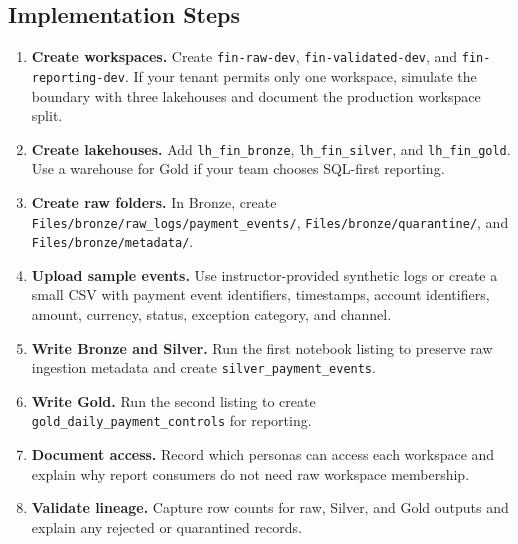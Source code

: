 \subsection*{Implementation Steps}
\begin{enumerate}
    \item \textbf{Create workspaces.} Create \texttt{fin-raw-dev}, \texttt{fin-validated-dev}, and \texttt{fin-reporting-dev}. If your tenant permits only one workspace, simulate the boundary with three lakehouses and document the production workspace split.
    \item \textbf{Create lakehouses.} Add \texttt{lh\_fin\_bronze}, \texttt{lh\_fin\_silver}, and \texttt{lh\_fin\_gold}. Use a warehouse for Gold if your team chooses SQL-first reporting.
    \item \textbf{Create raw folders.} In Bronze, create \texttt{Files/bronze/raw\_logs/payment\_events/}, \texttt{Files/bronze/quarantine/}, and \texttt{Files/bronze/metadata/}.
    \item \textbf{Upload sample events.} Use instructor-provided synthetic logs or create a small CSV with payment event identifiers, timestamps, account identifiers, amount, currency, status, exception category, and channel.
    \item \textbf{Write Bronze and Silver.} Run the first notebook listing to preserve raw ingestion metadata and create \texttt{silver\_payment\_events}.
    \item \textbf{Write Gold.} Run the second listing to create \texttt{gold\_daily\_payment\_controls} for reporting.
    \item \textbf{Document access.} Record which personas can access each workspace and explain why report consumers do not need raw workspace membership.
    \item \textbf{Validate lineage.} Capture row counts for raw, Silver, and Gold outputs and explain any rejected or quarantined records.
\end{enumerate}

